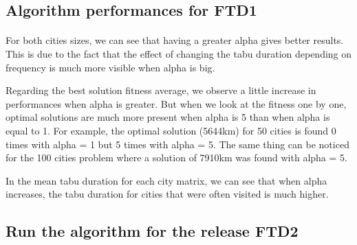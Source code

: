 \documentclass[12pt,oneside,a4paper]{article}
\begin{document}
\subsection{Algorithm performances for FTD1}
\paragraph{}
For both cities sizes, we can see that having a greater alpha gives better results.
This is due to the fact that the effect of changing the tabu duration depending
on frequency is much more visible when alpha is big.

Regarding the best solution fitness average, we observe a little increase in
performances when alpha is greater. But when we look at the fitness one by one,
optimal solutions are much more present when alpha is 5 than when alpha is equal to 1.
For example, the optimal solution (5644km) for 50 cities is found 0 times with alpha = 1 but
5 times with alpha = 5. The same thing can be noticed for the 100 cities problem where
a solution of 7910km was found with alpha = 5.

In the mean tabu duration for each city matrix, we can see that when alpha increases, the tabu
duration for cities that were often visited is much higher.

\subsection{Run the algorithm for the release FTD2}
\end{document}

